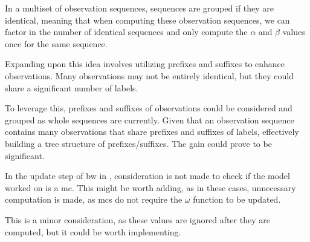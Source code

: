 In a multiset of observation sequences, sequences are grouped if they are identical, meaning that when computing these observation sequences, we can factor in the number of identical sequences and only compute the $\alpha$ and $\beta$ values once for the same sequence.

Expanding upon this idea involves utilizing prefixes and suffixes to enhance observations.
Many observations may not be entirely identical, but they could share a significant number of labels.

To leverage this, prefixes and suffixes of observations could be considered and grouped as whole sequences are currently.
Given that an observation sequence contains many observations that share prefixes and suffixes of labels, effectively building a tree structure of prefixes/suffixes.
The gain could prove to be significant.

In the update step of \gls{bw} in \Cupaal, consideration is not made to check if the model worked on is a \gls{mc}.
This might be worth adding, as in these cases, unnecessary computation is made, as \glspl{mc} do not require the $\omega$ function to be updated.

This is a minor consideration, as these values are ignored after they are computed, but it could be worth implementing.
